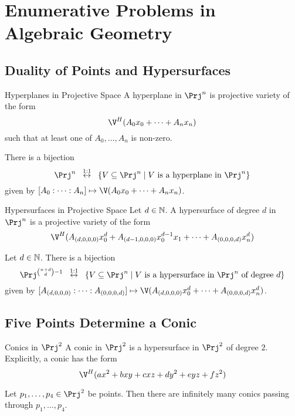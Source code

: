 \documentclass[a4paper]{article}
\begin{document}
\pagebreak
\section{Enumerative Problems in Algebraic Geometry}
\subsection{Duality of Points and Hypersurfaces}
\begin{defn}{Hyperplanes in Projective Space}{} A hyperplane in $\Prj^n$ is projective variety of the form $$\V^H(A_0x_0+\cdots+A_nx_n)$$ such that at least one of $A_0,\dots,A_n$ is non-zero. 
\end{defn}

\begin{prp}{}{} There is a bijection $$\Prj^n\;\;\overset{1:1}{\leftrightarrow}\;\;\{V\subseteq\Prj^n\;|\;V\text{ is a hyperplane in }\Prj^n\}$$ given by $[A_0:\cdots:A_n]\mapsto\V(A_0x_0+\cdots+A_nx_n)$. 
\end{prp}

\begin{defn}{Hypersurfaces in Projective Space}{} Let $d\in\mathbb{N}$. A hypersurface of degree $d$ in $\Prj^n$ is a projective variety of the form $$\V^H(A_{(d,0,0,0)}x_0^d+A_{(d-1,0,0,0)}x_0^{d-1}x_1+\cdots+A_{(0,0,0,d)}x_n^d)$$
\end{defn}

\begin{prp}{}{} Let $d\in\mathbb{N}$. There is a bijection $$\Prj^{\binom{n+d}{d}-1}\;\;\overset{1:1}{\leftrightarrow}\;\;\{V\subseteq\Prj^n\;|\;V\text{ is a hypersurface in }\Prj^n\text{ of degree }d\}$$ given by $[A_{(d,0,0,0)}:\cdots:A_{(0,0,0,d)}]\mapsto\V(A_{(d,0,0,0)}x_0^d+\cdots+A_{(0,0,0,d)}x_n^d)$. 
\end{prp}

\subsection{Five Points Determine a Conic}
\begin{defn}{Conics in $\Prj^2$}{} A conic in $\Prj^2$ is a hypersurface in $\Prj^2$ of degree $2$. Explicitly, a conic has the form $$\V^H(ax^2+bxy+cxz+dy^2+eyz+fz^2)$$
\end{defn}

\begin{prp}{}{} Let $p_1,\dots,p_4\in\Prj^2$ be points. Then there are infinitely many conics passing through $p_1,\dots,p_4$. 
\end{prp}
\end{document}
